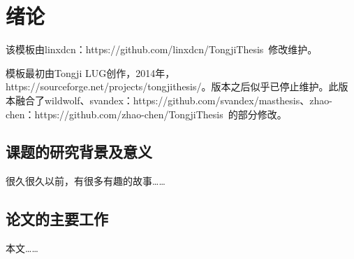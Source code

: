 \chapter{绪论}
\label{chap:introduction}

该模板由linxdcn：https://github.com/linxdcn/TongjiThesis~修改维护。

模板最初由Tongji LUG创作，2014年，https://sourceforge.net/projects/tongjithesis/。版本之后似乎已停止维护。此版本融合了wildwolf、svandex：https://github.com/svandex/masthesis、zhao-chen：https://github.com/zhao-chen/TongjiThesis~的部分修改。

\section{课题的研究背景及意义}

很久很久以前\cite{tex}，有很多有趣的故事\cite{shaheshang}……

\section{论文的主要工作}

本文……
